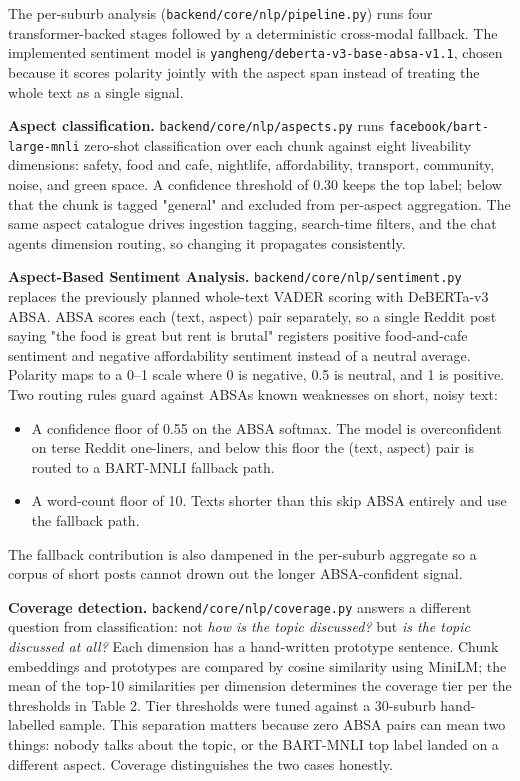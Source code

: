 \documentclass[11pt,a4paper]{article}
\newcommand{\passthrough}[1]{#1}
\providecommand{\tightlist}{%
  \setlength{\itemsep}{0pt}\setlength{\parskip}{0pt}}
\begin{document}
The per-suburb analysis (\passthrough{\lstinline!backend/core/nlp/pipeline.py!}) runs four transformer-backed stages followed by a deterministic cross-modal fallback. The implemented sentiment model is \passthrough{\lstinline!yangheng/deberta-v3-base-absa-v1.1!}, chosen because it scores polarity jointly with the aspect span instead of treating the whole text as a single signal.

\textbf{Aspect classification.} \passthrough{\lstinline!backend/core/nlp/aspects.py!} runs \passthrough{\lstinline!facebook/bart-large-mnli!} zero-shot classification over each chunk against eight liveability dimensions: safety, food and cafe, nightlife, affordability, transport, community, noise, and green space. A confidence threshold of 0.30 keeps the top label; below that the chunk is tagged "general" and excluded from per-aspect aggregation. The same aspect catalogue drives ingestion tagging, search-time filters, and the chat agent\textquotesingle s dimension routing, so changing it propagates consistently.

\textbf{Aspect-Based Sentiment Analysis.} \passthrough{\lstinline!backend/core/nlp/sentiment.py!} replaces the previously planned whole-text VADER scoring with DeBERTa-v3 ABSA. ABSA scores each (text, aspect) pair separately, so a single Reddit post saying "the food is great but rent is brutal" registers positive food-and-cafe sentiment and negative affordability sentiment instead of a neutral average. Polarity maps to a 0--1 scale where 0 is negative, 0.5 is neutral, and 1 is positive. Two routing rules guard against ABSA\textquotesingle s known weaknesses on short, noisy text:

\begin{itemize}
\tightlist
\item
  A confidence floor of 0.55 on the ABSA softmax. The model is overconfident on terse Reddit one-liners, and below this floor the (text, aspect) pair is routed to a BART-MNLI fallback path.
\item
  A word-count floor of 10. Texts shorter than this skip ABSA entirely and use the fallback path.
\end{itemize}

The fallback contribution is also dampened in the per-suburb aggregate so a corpus of short posts cannot drown out the longer ABSA-confident signal.

\textbf{Coverage detection.} \passthrough{\lstinline!backend/core/nlp/coverage.py!} answers a different question from classification: not \emph{how is the topic discussed?} but \emph{is the topic discussed at all?} Each dimension has a hand-written prototype sentence. Chunk embeddings and prototypes are compared by cosine similarity using MiniLM; the mean of the top-10 similarities per dimension determines the coverage tier per the thresholds in Table 2. Tier thresholds were tuned against a 30-suburb hand-labelled sample. This separation matters because zero ABSA pairs can mean two things: nobody talks about the topic, or the BART-MNLI top label landed on a different aspect. Coverage distinguishes the two cases honestly.
\end{document}
